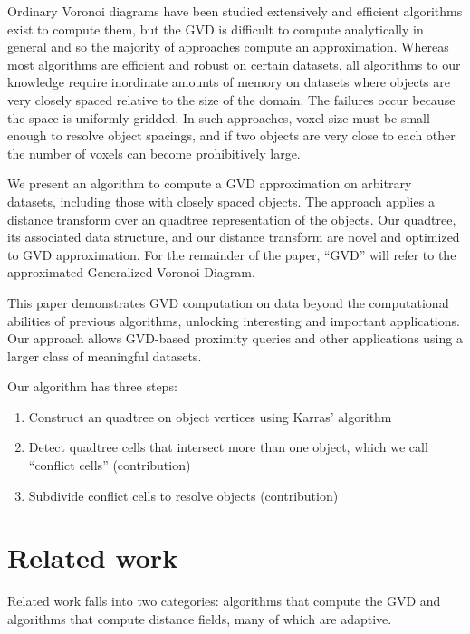 \documentclass{egpubl}
\begin{document}
Ordinary Voronoi diagrams have been studied extensively and efficient algorithms exist to compute them, but the GVD is difficult to compute analytically in general \cite{boissonnat2006curved,hoff1999fast} and so the majority of approaches compute an approximation.  Whereas most algorithms are efficient and robust on certain datasets, all algorithms to our knowledge require inordinate amounts of memory on datasets where objects are very closely spaced relative to the size of the domain.  The failures occur because the space is uniformly gridded.  In such approaches, voxel size must be small enough to resolve object spacings, and if two objects are very close to each other the number of voxels can become prohibitively large.

We present an algorithm to compute a GVD approximation on arbitrary datasets, including those with closely spaced objects.  The approach applies a distance transform over an quadtree representation of the objects.  Our quadtree, its associated data structure, and our distance transform are novel and optimized to GVD approximation. For the remainder of the paper, ``GVD'' will refer to the approximated Generalized Voronoi Diagram.

This paper demonstrates GVD computation on data beyond the computational abilities of previous algorithms, unlocking interesting and important applications.  Our approach allows GVD-based proximity queries and other applications using a larger class of meaningful datasets.


Our algorithm has three steps:

\begin{enumerate}
\item Construct an quadtree on object vertices using Karras' algorithm \cite{karras2012maximizing}
\item Detect quadtree cells that intersect more than one object, which we call ``conflict cells'' (contribution)
\item Subdivide conflict cells to resolve objects (contribution)
\end{enumerate}

\section{Related work}
Related work falls into two categories: algorithms that compute the GVD and algorithms that compute distance fields, many of which are adaptive.
\end{document}
